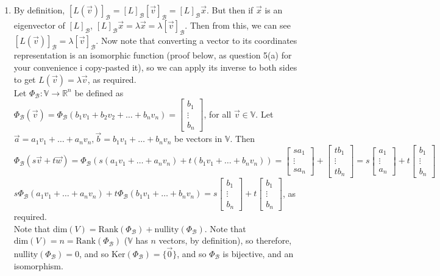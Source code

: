 \documentclass[10pt,english]{article}
\begin{document}
\begin{enumerate}
\pagebreak
\item By definition, $[L(\vec{v})]_\mathcal{B}=[L]_\mathcal{B}[\vec{v}]_\mathcal{B}=[L]_\mathcal{B}\vec{x}$. But then if $\vec{x}$ is an eigenvector of $[L]_\mathcal{B}$, $[L]_\mathcal{B}\vec{x}=\lambda\vec{x}=\lambda[\vec{v}]_\mathcal{B}$. Then from this, we can see $[L(\vec{v})]_\mathcal{B}=\lambda[\vec{v}]_\mathcal{B}$. Now note that converting a vector to its coordinates representation is an isomorphic function (proof below, as question 5(a) for your convenience i copy-pasted it), so we can apply its inverse to both sides to get $L(\vec{v})=\lambda\vec{v}$, as required. \\ 
Let $\Phi_\mathcal{B}:\mathbb{V}\rightarrow \mathbb{R}^n$ be defined as $\Phi_{\mathcal{B}}(\vec{v})=\Phi_{\mathcal{B}}(b_1v_1+b_2v_2+\ldots+b_nv_n)=\begin{bmatrix}b_1\\\vdots\\b_n\end{bmatrix}$, for all $\vec{v}\in \mathbb{V}$. Let $\vec{a}=a_1v_1+\ldots+a_nv_n,\vec{b}=b_1v_1+\ldots+b_nv_n$ be vectors in $\mathbb{V}$. Then $\Phi_{\mathcal{B}}(s\vec{v}+t\vec{w})=\Phi_{\mathcal{B}}(s(a_1v_1+\ldots+a_nv_n)+t(b_1v_1+\ldots+b_nv_n))=\begin{bmatrix}sa_1\\\vdots\\sa_n\end{bmatrix}+\begin{bmatrix}tb_1\\\vdots\\tb_n\end{bmatrix}=s\begin{bmatrix}a_1\\\vdots\\a_n\end{bmatrix}+t\begin{bmatrix}b_1\\\vdots\\b_n\end{bmatrix}$ \\ 
$s\Phi_\mathcal{B}(a_1v_1+\ldots+a_nv_n)+t\Phi_\mathcal{B}(b_1v_1+\ldots+b_nv_n)=s\begin{bmatrix}b_1\\\vdots\\b_n\end{bmatrix}+t\begin{bmatrix}b_1\\\vdots\\b_n\end{bmatrix}$, as required. \\ 
Note that dim$(V)=\text{Rank}(\Phi_\mathcal{B})+\text{nullity}(\Phi_\mathcal{B})$. Note that $\text{dim}(V)=n=\text{Rank}(\Phi_\mathcal{B})$ ($\mathbb{V}$ has $n$ vectors, by definition), so therefore, nullity$(\Phi_\mathcal{B})=0$, and so $\text{Ker}(\Phi_\mathcal{B})=\{\vec{0}\}$, and so $\Phi_\mathcal{B}$ is bijective, and an isomorphism. 





\end{enumerate}
\end{document}
